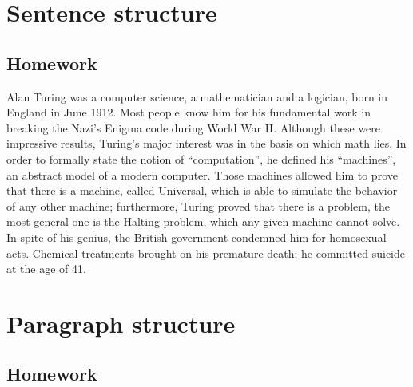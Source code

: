 \documentclass[a4paper,dottedtoc,headinclude,footinclude]{report} %
\theoremstyle{plain}
\begin{document}
    \title{\rmfamily\normalfont{}}
    \author{}
    \date{\today} 
    
    \maketitle
    
    \begin{abstract}
        \noindent In this report we collect our work during classes of \emph{Scientific Writing -- 8641}
        course, taught in Florence during Winter 2016.
    \end{abstract}
       
    \tableofcontents
    

    \chapter{Sentence structure}
    
    \section{Homework}

    Alan Turing was a computer science, a mathematician and a logician,
    born in England in June 1912. Most people know him for his
    fundamental work in breaking the Nazi's Enigma code during World War
    II. Although these were impressive results, Turing's major interest was in
    the basis on which math lies.  In order to formally state the notion
    of ``computation'', he defined his ``machines'', an abstract model of
    a modern computer. Those machines allowed him to prove that there
    is a machine, called Universal, which is able to simulate the behavior of
    any other machine; furthermore, Turing proved that there is a
    problem, the most general one is the Halting problem, which any 
    given machine cannot solve. 
    In spite of his genius, the British government condemned him for
    homosexual acts. Chemical treatments brought on his premature death;
    he committed suicide at the age of 41.

    \chapter{Paragraph structure}
    
    \section{Homework}
\end{document}

